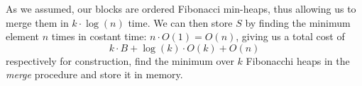 As we assumed, our blocks are ordered Fibonacci min-heaps, thus allowing us to merge them in $k \cdot \log(n)$ time.
We can then store $S$ by finding the minimum element $n$ times in costant time: $n \cdot O(1) = O(n)$, giving us a total cost of
    \begin{equation*}
    k \cdot B + \log(k) \cdot O(k) + O(n)
    \end{equation*}
respectively for construction, find the minimum over $k$ Fibonacchi heaps in the \emph{merge} procedure and store it in memory.
